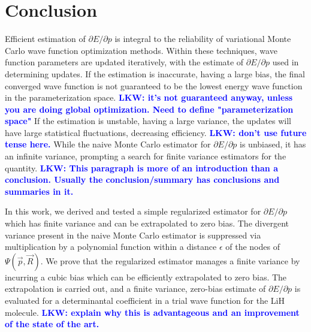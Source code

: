 \documentclass[twocolumn]{revtex4-1}
\newcommand{\lucas}[1]{\textbf{\textcolor{blue}{LKW: #1}}}
\begin{document}
\section{Conclusion}
Efficient estimation of $\partial E/\partial p$ is integral to the reliability of variational Monte Carlo wave function optimization methods.
Within these techniques, wave function parameters are updated iteratively, with the estimate of $\partial E/\partial p$ used in determining updates.
If the estimation is inaccurate, having a large bias, the final converged wave function is not guaranteed to be the lowest energy wave function in the parameterization space.
\lucas{it's not guaranteed anyway, unless you are doing global optimization. Need to define "parameterization space"}
If the estimation is unstable, having a large variance, the updates will have large statistical fluctuations, decreasing efficiency.
\lucas{don't use future tense here.}
While the naive Monte Carlo estimator for $\partial E/\partial p$ is unbiased, it has an infinite variance, prompting a search for finite variance estimators for the quantity.
\lucas{This paragraph is more of an introduction than a conclusion. Usually the conclusion/summary has conclusions and summaries in it.} 

In this work, we derived and tested a simple regularized estimator for $\partial E/\partial p$ which has finite variance and can be extrapolated to zero bias.
The divergent variance present in the naive Monte Carlo estimator is suppressed via multiplication by a polynomial function within a distance $\epsilon$ of the nodes of $\Psi(\vec{p}, \vec{R})$. 
We prove that the regularized estimator manages a finite variance by incurring a cubic bias which can be efficiently extrapolated to zero bias.
The extrapolation is carried out, and a finite variance, zero-bias estimate of $\partial E/\partial p$ is evaluated for a determinantal coefficient in a trial wave function for the LiH molecule.
\lucas{explain why this is advantageous and an improvement of the state of the art. }

%

\end{document}
